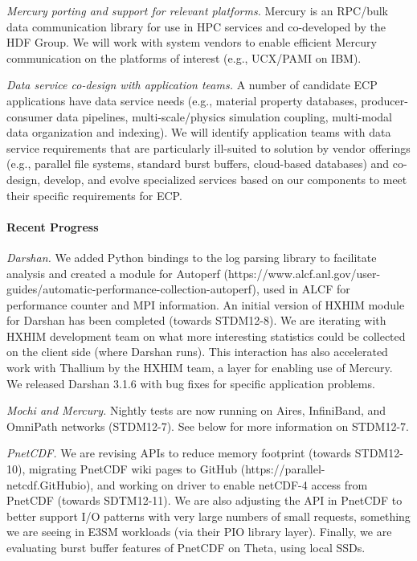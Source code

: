 \emph{Mercury porting and support for relevant platforms.}
Mercury is an RPC/bulk data communication library for use in HPC
services and co-developed by the HDF Group. We will work with system
vendors to enable efficient Mercury communication on the platforms of
interest (e.g., UCX/PAMI on IBM).

\emph{Data service co-design with application teams.}
A number of candidate ECP applications have data service needs (e.g.,
material property databases, producer-consumer data pipelines,
multi-scale/physics simulation coupling, multi-modal data organization
and indexing). We will identify application teams with data service
requirements that are particularly ill-suited to solution by vendor
offerings (e.g., parallel file systems, standard burst buffers,
cloud-based databases) and co-design, develop, and evolve specialized
services based on our components to meet their specific requirements
for ECP.

\paragraph{Recent Progress}

\emph{Darshan.}
We added Python bindings to the log parsing library to facilitate
analysis and created a module for Autoperf
(https://www.alcf.anl.gov/user-guides/automatic-performance-collection-autoperf),
used in ALCF for performance counter and MPI information. An initial
version of HXHIM module for Darshan has been completed (towards
STDM12-8). We are iterating with HXHIM development team on what more
interesting statistics could be collected on the client side (where
Darshan runs). This interaction has also accelerated work with
Thallium by the HXHIM team, a layer for enabling use of
Mercury. We released Darshan 3.1.6 with bug fixes for specific
application problems.

\emph{Mochi and Mercury.}
Nightly tests are now running on Aires, InfiniBand, and OmniPath networks
(STDM12-7). See below for more information on STDM12-7.

\emph{PnetCDF.}
We are revising APIs to reduce memory footprint (towards STDM12-10),
migrating PnetCDF wiki pages to GitHub
(https://parallel-netcdf.GitHubio), and working on driver to enable
netCDF-4 access from PnetCDF (towards SDTM12-11). We are also adjusting the
API in PnetCDF to better support I/O patterns with very
large numbers of small requests, something we are seeing in E3SM
workloads (via their PIO library layer). Finally, we are evaluating burst buffer
features of PnetCDF on Theta, using local SSDs.

